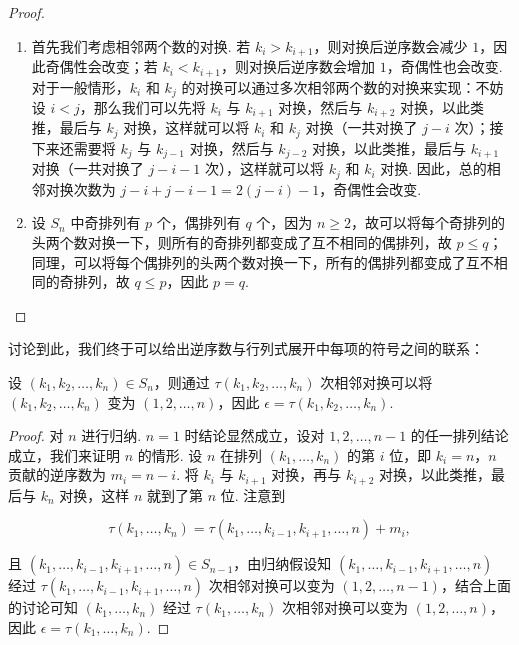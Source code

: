 \begin{proof}
    \begin{enumerate}
        \item 首先我们考虑相邻两个数的对换. 若 $k_i > k_{i+1}$，则对换后逆序数会减少 $1$，因此奇偶性会改变；若 $k_i < k_{i+1}$，则对换后逆序数会增加 $1$，奇偶性也会改变. 对于一般情形，$k_i$ 和 $k_j$ 的对换可以通过多次相邻两个数的对换来实现：不妨设 $i < j$，那么我们可以先将 $k_i$ 与 $k_{i+1}$ 对换，然后与 $k_{i+2}$ 对换，以此类推，最后与 $k_j$ 对换，这样就可以将 $k_i$ 和 $k_j$ 对换（一共对换了 $j-i$ 次）；接下来还需要将 $k_j$ 与 $k_{j-1}$ 对换，然后与 $k_{j-2}$ 对换，以此类推，最后与 $k_{i+1}$ 对换（一共对换了 $j-i-1$ 次），这样就可以将 $k_j$ 和 $k_i$ 对换. 因此，总的相邻对换次数为 $j-i+j-i-1=2(j-i)-1$，奇偶性会改变.
        \item 设 $S_n$ 中奇排列有 $p$ 个，偶排列有 $q$ 个，因为 $n \geqslant 2$，故可以将每个奇排列的头两个数对换一下，则所有的奇排列都变成了互不相同的偶排列，故 $p \leqslant q$；同理，可以将每个偶排列的头两个数对换一下，所有的偶排列都变成了互不相同的奇排列，故 $q \leqslant p$，因此 $p = q$.
    \end{enumerate}
\end{proof}

讨论到此，我们终于可以给出逆序数与行列式展开中每项的符号之间的联系：

\begin{theorem}{}{}
    设 $(k_1,k_2,\ldots,k_n) \in S_n$，则通过 $\tau(k_1,k_2,\ldots,k_n)$ 次相邻对换可以将 $(k_1,k_2,\ldots,k_n)$ 变为 $(1,2,\ldots,n)$，因此 $\epsilon = \tau(k_1,k_2,\ldots,k_n)$.
\end{theorem}

\begin{proof}
    对 $n$ 进行归纳. $n=1$ 时结论显然成立，设对 $1,2,\ldots,n-1$ 的任一排列结论成立，我们来证明 $n$ 的情形. 设 $n$ 在排列 $(k_1,\ldots,k_n)$ 的第 $i$ 位，即 $k_i = n$，$n$ 贡献的逆序数为 $m_i = n - i$. 将 $k_i$ 与 $k_{i+1}$ 对换，再与 $k_{i+2}$ 对换，以此类推，最后与 $k_n$ 对换，这样 $n$ 就到了第 $n$ 位. 注意到

    \[ \tau(k_1,\ldots,k_n) = \tau(k_1,\ldots,k_{i-1},k_{i+1},\ldots,n) + m_i,\]

    且 $(k_1,\ldots,k_{i-1},k_{i+1},\ldots,n) \in S_{n-1}$，由归纳假设知 $(k_1,\ldots,k_{i-1},k_{i+1},\ldots,n)$ 经过 $\tau(k_1,\ldots,k_{i-1},k_{i+1},\ldots,n)$ 次相邻对换可以变为 $(1,2,\ldots,n-1)$，结合上面的讨论可知 $(k_1,\ldots,k_n)$ 经过 $\tau(k_1,\ldots,k_n)$ 次相邻对换可以变为 $(1,2,\ldots,n)$，因此 $\epsilon = \tau(k_1,\ldots,k_n)$.
\end{proof}

